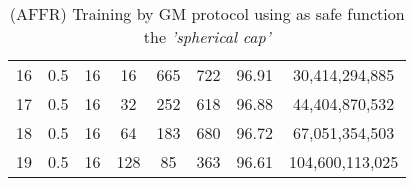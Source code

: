 \begin{table}[H]
\begin{tabular}{|c|c|c|c|c|c|c|c|}
        16                     & 0.5                   & 16                    & 16                    & 665                   & 722                   & 96.91                 & 30,414,294,885           \\
        17                     & 0.5                   & 16                    & 32                    & 252                   & 618                   & 96.88                 & 44,404,870,532           \\
        18                     & 0.5                   & 16                    & 64                    & 183                   & 680                   & 96.72                 & 67,051,354,503           \\
        19                     & 0.5                   & 16                    & 128                   & 85                    & 363                   & 96.61                 & 104,600,113,025          \\
        \hline
    \end{tabular}
    \caption{(AFFR) Training by GM protocol using as safe function the \emph{'spherical cap'}}
    \label{tab:table-gm-sf2-nlp-exp}
\end{table}

\newpage

